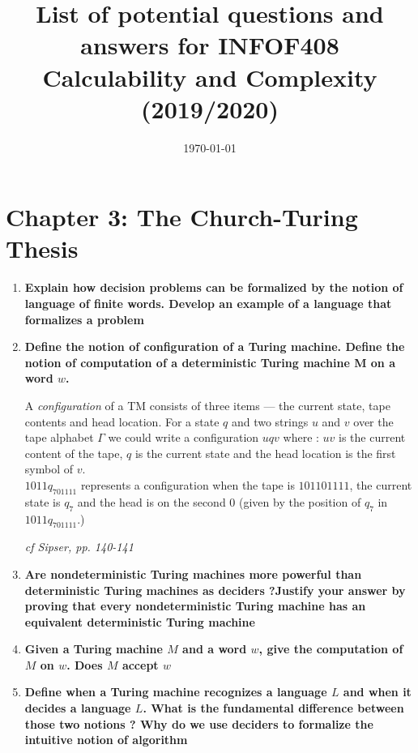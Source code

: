\documentclass{article}
\title{List of potential questions and answers for INFOF408 Calculability and Complexity (2019/2020)}
\date{\today}
\begin{document}
\maketitle
\tableofcontents
\clearpage

\section{Chapter 3: The Church-Turing Thesis}

\begin{enumerate}

\item \textbf{Explain how decision problems can be formalized by the notion of language of finite words. Develop an example of a language that formalizes a problem}

\item \textbf{Define the notion of configuration of a Turing machine. Define the notion of computation of a deterministic Turing machine M on a word $w$.}



A \emph{configuration} of a TM consists of three items --- the current state, tape contents and head location. For a state $q$ and two strings $u$ and $v$ over the tape alphabet $\Gamma$ we could write a configuration $uqv$ where : $uv$ is the current content of the tape, $q$ is the current state and the head location is the first symbol of $v$.\\

$1011q_701111$ represents a configuration when the tape is $101101111$, the current state is $q_7$ and the head is on the second $0$ (given by the position of $q_7$ in $1011q_701111$.)

\emph{cf Sipser, pp. 140-141}




\item \textbf{Are nondeterministic Turing machines more powerful than deterministic Turing machines as deciders ?Justify your answer by proving that every nondeterministic Turing machine has an equivalent deterministic Turing machine}

\item \textbf{Given a Turing machine $M$ and a word $w$, give the computation of $M$ on $w$. Does $M$ accept $w$}

\item \textbf{Define when a Turing machine recognizes a language $L$ and when it decides a language $L$. What is the fundamental difference between those two notions ? Why do we use deciders to formalize the intuitive notion of algorithm}


\end{enumerate}
\end{document}
